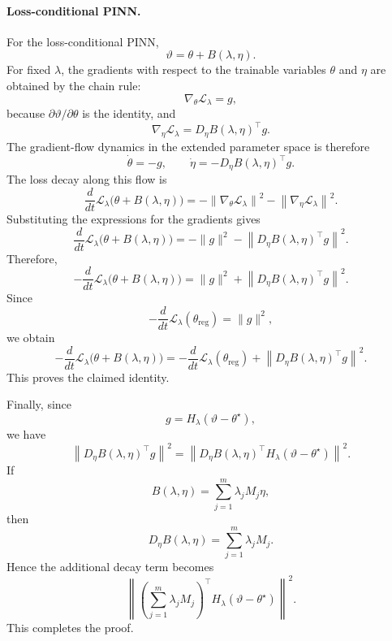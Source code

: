 \documentclass{article}
\theoremstyle{plain}
\theoremstyle{definition}
\theoremstyle{remark}
\begin{document}
\paragraph{Loss-conditional PINN.}
For the loss-conditional PINN,
\[
    \vartheta
    =
    \theta + B(\lambda,\eta).
\]
For fixed $\lambda$, the gradients with respect to the trainable
variables $\theta$ and $\eta$ are obtained by the chain rule:
\[
    \nabla_\theta
    \mathcal{L}_{\lambda}
    =
    g,
\]
because $\partial \vartheta / \partial \theta$ is the identity, and
\[
    \nabla_\eta
    \mathcal{L}_{\lambda}
    =
    D_\eta B(\lambda,\eta)^\top g .
\]
The gradient-flow dynamics in the extended parameter space is therefore
\[
    \dot{\theta}
    =
    -g,
    \qquad
    \dot{\eta}
    =
    -
    D_\eta B(\lambda,\eta)^\top g .
\]
The loss decay along this flow is
\[
    \frac{d}{dt}
    \mathcal{L}_{\lambda}
    \bigl(
        \theta+B(\lambda,\eta)
    \bigr)
    =
    -
    \left\|
        \nabla_\theta
        \mathcal{L}_{\lambda}
    \right\|^2
    -
    \left\|
        \nabla_\eta
        \mathcal{L}_{\lambda}
    \right\|^2 .
\]
Substituting the expressions for the gradients gives
\[
    \frac{d}{dt}
    \mathcal{L}_{\lambda}
    \bigl(
        \theta+B(\lambda,\eta)
    \bigr)
    =
    -
    \|g\|^2
    -
    \left\|
        D_\eta B(\lambda,\eta)^\top g
    \right\|^2 .
\]
Therefore,
\[
    -
    \frac{d}{dt}
    \mathcal{L}_{\lambda}
    \bigl(
        \theta+B(\lambda,\eta)
    \bigr)
    =
    \|g\|^2
    +
    \left\|
        D_\eta B(\lambda,\eta)^\top g
    \right\|^2 .
\]
Since
\[
    -
    \frac{d}{dt}
    \mathcal{L}_{\lambda}(\theta_{\mathrm{reg}})
    =
    \|g\|^2,
\]
we obtain
\[
    -
    \frac{d}{dt}
    \mathcal{L}_{\lambda}
    \bigl(
        \theta+B(\lambda,\eta)
    \bigr)
    =
    -
    \frac{d}{dt}
    \mathcal{L}_{\lambda}(\theta_{\mathrm{reg}})
    +
    \left\|
        D_\eta B(\lambda,\eta)^\top g
    \right\|^2 .
\]
This proves the claimed identity.

Finally, since
\[
    g
    =
    H_\lambda(\vartheta-\theta^\star),
\]
we have
\[
    \left\|
        D_\eta B(\lambda,\eta)^\top g
    \right\|^2
    =
    \left\|
        D_\eta B(\lambda,\eta)^\top
        H_\lambda(\vartheta-\theta^\star)
    \right\|^2 .
\]
If
\[
    B(\lambda,\eta)
    =
    \sum_{j=1}^m \lambda_j M_j \eta,
\]
then
\[
    D_\eta B(\lambda,\eta)
    =
    \sum_{j=1}^m \lambda_j M_j .
\]
Hence the additional decay term becomes
\[
    \left\|
        \left(
            \sum_{j=1}^m \lambda_j M_j
        \right)^\top
        H_\lambda
        (\vartheta-\theta^\star)
    \right\|^2 .
\]
This completes the proof.
\end{document}
